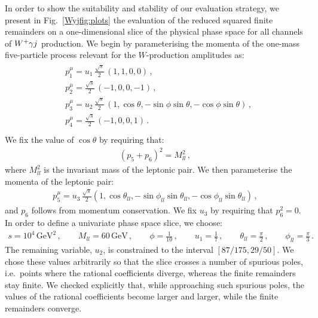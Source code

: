 \documentclass[main.tex]{subfiles}
\begin{document}
In order to show the suitability and stability of our evaluation strategy, we present in Fig.~\ref{Wyjfig:plots} the evaluation of the reduced squared finite remainders on a one-dimensional slice of the physical phase space for all channels of $W^+\gamma j$ production. We begin by parameterising the momenta of the one-mass five-particle process relevant for the $W$-production amplitudes as:
\begin{align} \label{Wyjeq:unislice1}
\begin{aligned}
& p_1^{\mu} = u_1 \, \frac{\sqrt{s}}{2} \, \left(1,1,0,0 \right) \,, \\
& p_2^{\mu} =  \frac{\sqrt{s}}{2} \, \left(-1,0,0,-1 \right) \,, \\
& p_3^{\mu} = u_2 \, \frac{\sqrt{s}}{2} \, \left(1,\cos\theta,-\sin \phi \sin \theta, -\cos \phi \sin\theta \right) \,, \\
& p_4^{\mu} =  \frac{\sqrt{s}}{2} \, \left(-1,0,0,1 \right) \,. \\
\end{aligned}
\end{align}
We fix the value of $\cos\theta$ by requiring that: 
\begin{align} \label{Wyjeq:unislice2}
(p_5+p_6)^2 = M^2_{ll} \,, 
\end{align}
where $M^2_{ll}$ is the invariant mass of the leptonic pair.
We then parameterise the momenta of the leptonic pair:
\begin{align} \label{Wyjeq:unislice3}
p_5^{\mu} = u_3 \, \frac{\sqrt{s}}{2}  \left(1,\cos\theta_{ll},-\sin \phi_{ll} \sin \theta_{ll}, -\cos \phi_{ll} \sin\theta_{ll} \right) \,,
\end{align}
and $p_6$ follows from momentum conservation.
We fix $u_3$ by requiring that $p_6^2 = 0$. In order to define a univariate phase space slice, we choose:
\begin{align} \label{Wyjeq:unisliceparams}
s = 10^4 \, \text{GeV}^2 \,, \qquad M_{ll} = 60 \, \text{GeV}  \,, \qquad \phi = \frac{1}{10} \,, \qquad u_1 = \frac{1}{7}\,, \qquad \theta_{ll} = \frac{\pi}{2} \,, \qquad \phi_{ll} = \frac{\pi}{3} \,.
\end{align}
The remaining variable, $u_2$, is constrained to the interval $[87/175, 29/50]$. We chose these values arbitrarily so that the slice crosses a number of spurious poles, i.e.\ points where the rational coefficients diverge, whereas the finite remainders stay finite. We checked explicitly that, while approaching such spurious poles, the values of the rational coefficients become larger and larger, while the finite remainders converge. 
\end{document}
